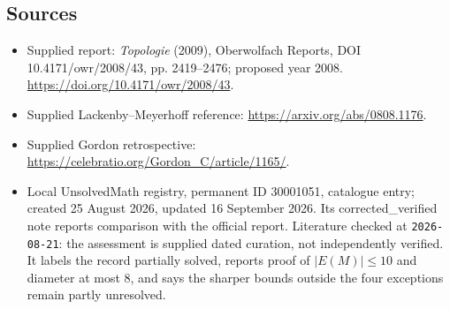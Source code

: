 \documentclass[11pt]{article}
\begin{document}
\subsection{Sources}
\begin{itemize}
\item Supplied report: \emph{Topologie} (2009), Oberwolfach Reports, DOI 10.4171/owr/2008/43, pp. 2419--2476; proposed year 2008. \url{https://doi.org/10.4171/owr/2008/43}.
\item Supplied Lackenby--Meyerhoff reference: \url{https://arxiv.org/abs/0808.1176}.
\item Supplied Gordon retrospective: \url{https://celebratio.org/Gordon_C/article/1165/}.
\item Local UnsolvedMath registry, permanent ID 30001051, catalogue entry; created 25 August 2026, updated 16 September 2026. Its corrected\_verified note reports comparison with the official report. Literature checked at \texttt{2026-08-21}: the assessment is supplied dated curation, not independently verified. It labels the record partially solved, reports proof of $|E(M)|\leq10$ and diameter at most $8$, and says the sharper bounds outside the four exceptions remain partly unresolved.
\end{itemize}
\end{document}
